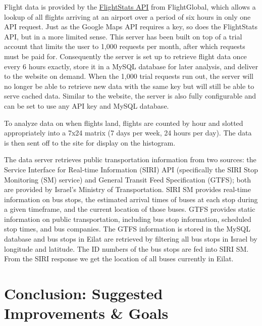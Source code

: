 \documentclass[12pt]{article}                       %
\begin{document}
Flight data is provided by the \underline{\href{https://www.flightstats.com/v2/}{FlightStats API}} from FlightGlobal, which allows a lookup of all flights arriving at an airport over a period of six hours in only one API request. Just as the Google Maps API requires a key, so does the FlightStats API, but in a more limited sense. This server has been built on top of a trial account that limits the user to 1,000 requests per month, after which requests must be paid for. Consequently the server is set up to retrieve flight data once every 6 hours exactly, store it in a MySQL database for later analysis, and deliver to the website on demand. When the 1,000 trial requests run out, the server will no longer be able to retrieve new data with the same key but will still be able to serve cached data. Similar to the website, the server is also fully configurable and can be set to use any API key and MySQL database.

To analyze data on when flights land, flights are counted by hour and slotted appropriately into a 7x24 matrix (7 days per week, 24 hours per day). The data is then sent off to the site for display on the histogram.

The data server retrieves public transportation information from two sources: the Service Interface for Real-time Information (SIRI) API (specifically the SIRI Stop Monitoring (SM) service) and General Transit Feed Specification (GTFS); both are provided by Israel's Ministry of Transportation. SIRI SM provides real-time information on bus stops, the estimated arrival times of buses at each stop during a given timeframe, and the current location of those buses. GTFS provides static information on public transportation, including bus stop information, scheduled stop times, and bus companies. The GTFS information is stored in the MySQL database and bus stops in Eilat are retrieved by filtering all bus stops in Israel by longitude and latitude. The ID numbers of the bus stops are fed into SIRI SM. From the SIRI response we get the location of all buses currently in Eilat.

\newpage
\section{Conclusion: Suggested Improvements \& Goals}
\end{document}
